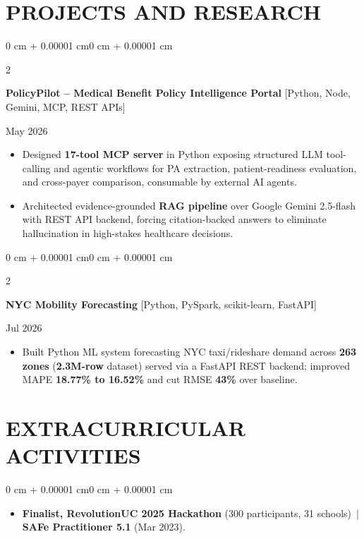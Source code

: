 \documentclass[10pt, letterpaper]{article}
\newenvironment{highlights}{
    \begin{itemize}[
        topsep=0.10 cm,
        parsep=0.06 cm,
        partopsep=0pt,
        itemsep=0.06 cm,
        leftmargin=12pt
    ]
}{
    \end{itemize}
}
\newenvironment{onecolentry}{
    \begin{adjustwidth}{0 cm + 0.00001 cm}{0 cm + 0.00001 cm}
}{
    \end{adjustwidth}
}
\newenvironment{twocolentry}[2][]{
    \onecolentry
    \def\secondColumn{#2}
    \setcolumnwidth{\fill, 4.5 cm}
    \begin{paracol}{2}
}{
    \switchcolumn \raggedleft \secondColumn
    \end{paracol}
    \endonecolentry
}
\begin{document}
\section{PROJECTS AND RESEARCH}
\begin{twocolentry}{May 2026}
\textbf{PolicyPilot -- Medical Benefit Policy Intelligence Portal} [Python, Node, Gemini, MCP, REST APIs]
\end{twocolentry}
\begin{highlights}
  \item Designed \textbf{17-tool MCP server} in Python exposing structured LLM tool-calling and agentic workflows for PA extraction, patient-readiness evaluation, and cross-payer comparison, consumable by external AI agents.
  \item Architected evidence-grounded \textbf{RAG pipeline} over Google Gemini 2.5-flash with REST API backend, forcing citation-backed answers to eliminate hallucination in high-stakes healthcare decisions.
\end{highlights}

\vspace{0.12 cm}

\begin{twocolentry}{Jul 2026}
\textbf{NYC Mobility Forecasting} [Python, PySpark, scikit-learn, FastAPI]
\end{twocolentry}
\begin{highlights}
  \item Built Python ML system forecasting NYC taxi/rideshare demand across \textbf{263 zones} (\textbf{2.3M-row} dataset) served via a FastAPI REST backend; improved MAPE \textbf{18.77\% to 16.52\%} and cut RMSE \textbf{43\%} over baseline.
\end{highlights}

\section{EXTRACURRICULAR ACTIVITIES}
\begin{onecolentry}
\begin{highlights}
  \item \textbf{Finalist, RevolutionUC 2025 Hackathon} (300 participants, 31 schools) \,|\, \textbf{SAFe Practitioner 5.1} (Mar 2023).
\end{highlights}
\end{onecolentry}
\end{document}
